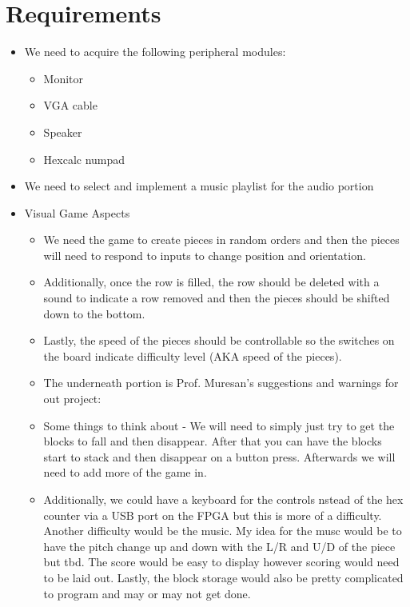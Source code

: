 \section{Requirements}
    \begin{itemize}
        \item We need to acquire the following peripheral modules:
            \begin{itemize}
                \item Monitor
                \item VGA cable
                \item Speaker
                \item Hexcalc numpad
            \end{itemize}
        \item We need to select and implement a music playlist for the audio portion
        \item Visual Game Aspects
        \begin{itemize}
            \item We need the game to create pieces in random orders and then the pieces will need to respond to inputs to change position and orientation. 
            \item Additionally, once the row is filled, the row should be deleted with a sound to indicate a row removed and then the pieces should be shifted down to the bottom.
            \item Lastly, the speed of the pieces should be controllable so the switches on the board indicate difficulty level (AKA speed of the pieces).
            \item The underneath portion is Prof. Muresan's suggestions and warnings for out project:
            \item Some things to think about - We will need to simply just try to get the blocks to fall and then disappear. After that you can have the blocks start to stack and then disappear on a button press. Afterwards we will need to add more of the game in. 
            \item Additionally, we could have a keyboard for the controls nstead of the hex counter via a USB port on the FPGA but this is more of a difficulty. Another difficulty would be the music. My idea for the musc would be to have the pitch change up and down with the L/R and U/D of the piece but tbd. The score would be easy to display however scoring would need to be laid out. Lastly, the block storage would also be pretty complicated to program and may or may not get done. 
        \end{itemize}
    \end{itemize}
